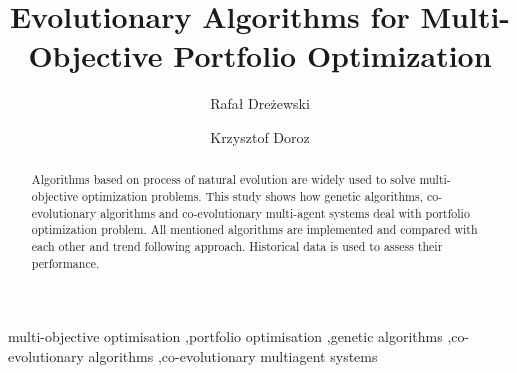 \documentclass[preprint,12pt]{elsarticle}
\begin{document}
\begin{frontmatter}



\title{Evolutionary Algorithms for Multi-Objective Portfolio Optimization}


\author[agh]{Rafa{\l} Dre{\.z}ewski}
\author[agh]{Krzysztof Doroz}

\address[agh]{AGH University of Science and Technology, Department of
  Computer Science Krakow, Poland}

\begin{abstract}

Algorithms based on process of natural evolution are widely used to solve multi-objective optimization problems.
This study shows how genetic algorithms, co-evolutionary algorithms and co-evolutionary multi-agent systems deal with portfolio optimization problem.
All mentioned algorithms are implemented and compared with each other and trend following approach.
Historical data is used to assess their performance.

\end{abstract}

\begin{keyword}

multi-objective optimisation \sep portfolio optimisation \sep genetic algorithms \sep co-evolutionary algorithms 
\sep co-evolutionary multiagent systems


\end{keyword}

\end{frontmatter}











\end{document}
